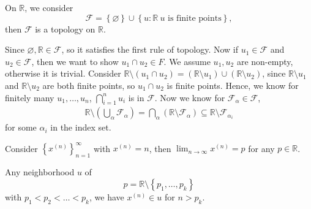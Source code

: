 \begin{eg}
    On \(\mathbb{R} \), we consider 
    \[
        \mathcal{F} = \left\{ \varnothing  \right\} \cup \left\{ u: \mathbb{R} \ u \text{ is finite points} \right\},  
    \] then \(\mathcal{F} \) is a topology on \(\mathbb{R} \).   
\end{eg}
\begin{explanation}
    Since \(\varnothing, \mathbb{R}  \in \mathcal{F} \), so it satisfies the first rule of topology. Now if \(u_1 \in \mathcal{F} \) and \(u_2 \in \mathcal{F} \), then we want to show \(u_1 \cap u_2 \in F\). We assume \(u_1, u_2\) are non-empty, otherwise it is trivial. Consider \(\mathbb{R} \setminus \left( u_1 \cap u_2 \right) = \left( \mathbb{R} \setminus u_1 \right) \cup \left( \mathbb{R} \setminus u_2 \right)   \), since  \(\mathbb{R} \setminus u_1\) and \(\mathbb{R} \setminus u_2\) are both finite points, so \(u_1 \cap u_2\) is finite points. Hence, we know for finitely many \(u_1, \dots , u_n\), \(\bigcap_{i=1}^{n} u_i \) is in \(\mathcal{F} \). Now we know for \(\mathcal{F} _\alpha \in \mathcal{F} \), 
    \begin{align*}
        \mathbb{R} \setminus \left( \bigcup_{\alpha } \mathcal{F} _{\alpha }  \right) = \bigcap_{\alpha } \left( \mathbb{R} \setminus \mathcal{F} _{\alpha } \right) \subseteq \mathbb{R} \setminus \mathcal{F}_{\alpha _i}  
    \end{align*}           
    for some \(\alpha _i\) in the index set. 
\end{explanation}

\begin{remark}
    Consider \(\left\{ x^{(n)} \right\}_{n=1}^{\infty}  \) with \(x^{(n)} = n\), then \(\lim_{n \to \infty} x^{(n)} = p \) for any \(p \in \mathbb{R} \).     
\end{remark}

\begin{remark}
    Any neighborhood \(u\) of 
    \[
        p = \mathbb{R} \setminus \left\{ p_1, \dots , p_k \right\} 
    \] with \(p_1 < p_2 < \dots < p_k\), we have \(x^{(n)} \in u\) for \(n > p_k\).  
\end{remark}